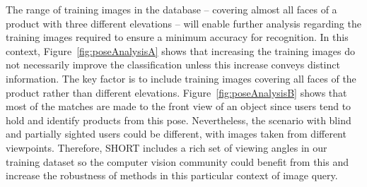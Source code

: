 

The range of training images in the database -- covering almost all faces of a product with three different elevations -- will enable further analysis regarding the training images required to ensure a minimum accuracy for recognition.  In this context, Figure~\ref{fig:poseAnalysisA} shows that increasing the training images do not necessarily improve the classification unless this increase conveys distinct information. The key factor is to include training images covering all faces of the product rather than different elevations. Figure~\ref{fig:poseAnalysisB} shows that most of the matches are made to the front view of an object since users tend to hold and identify products from this pose. Nevertheless, the scenario with blind and partially sighted users could be different, with images taken from different viewpoints.  Therefore, SHORT includes a rich set of viewing angles in our training dataset so the computer vision community could benefit from this and increase the robustness of methods in this particular context of image query.



